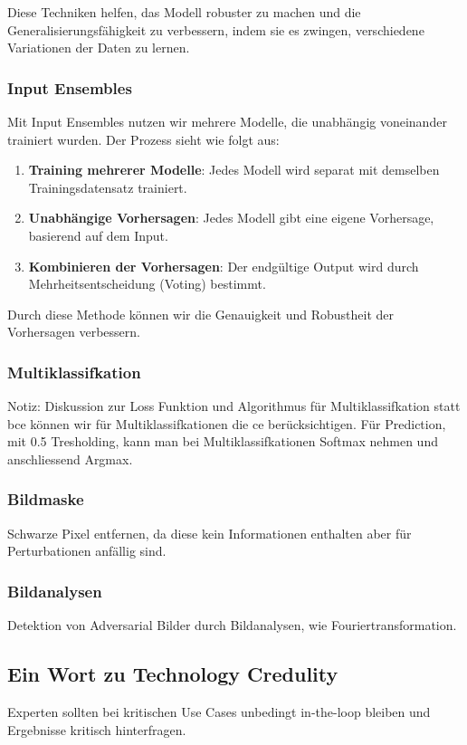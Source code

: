 Diese Techniken helfen, das Modell robuster zu machen und die Generalisierungsfähigkeit zu verbessern, indem sie es zwingen, verschiedene Variationen der Daten zu lernen.

\subsubsection{Input Ensembles}


Mit Input Ensembles nutzen wir mehrere Modelle, die unabhängig voneinander trainiert wurden. Der Prozess sieht wie folgt aus:

\begin{enumerate}
    \item \textbf{Training mehrerer Modelle}: Jedes Modell wird separat mit demselben Trainingsdatensatz trainiert.
    \item \textbf{Unabhängige Vorhersagen}: Jedes Modell gibt eine eigene Vorhersage, basierend auf dem Input.
    \item \textbf{Kombinieren der Vorhersagen}: Der endgültige Output wird durch Mehrheitsentscheidung (Voting) bestimmt. 
\end{enumerate}

Durch diese Methode können wir die Genauigkeit und Robustheit der Vorhersagen verbessern.

\subsubsection{Multiklassifkation}

Notiz: Diskussion zur Loss Funktion und Algorithmus für Multiklassifkation
statt \acrlong{bce} können wir für Multiklassifkationen die \acrlong{ce} berücksichtigen. 
Für Prediction, mit 0.5 Tresholding, kann man bei Multiklassifkationen Softmax nehmen und anschliessend Argmax. 

\subsubsection{Bildmaske}

Schwarze Pixel entfernen, da diese kein Informationen enthalten aber für Perturbationen anfällig sind. 

\subsubsection{Bildanalysen}
Detektion von Adversarial Bilder durch Bildanalysen, wie Fouriertransformation. 

\subsection{Ein Wort zu Technology Credulity}
Experten sollten bei kritischen Use Cases unbedingt in-the-loop bleiben und Ergebnisse kritisch hinterfragen.
